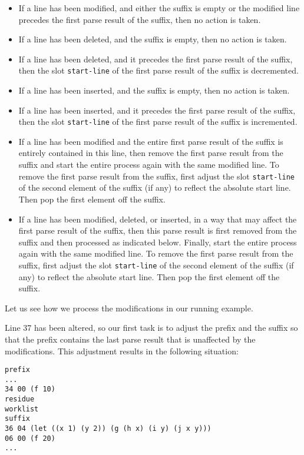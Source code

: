 \begin{itemize}
\item If a line has been modified, and either the suffix is empty or
  the modified line precedes the first parse result of the suffix,
  then no action is taken.
\item If a line has been deleted, and the suffix is empty, then no
  action is taken.
\item If a line has been deleted, and it precedes the first parse
  result of the suffix, then the slot \texttt{start-line} of the first
  parse result of the suffix is decremented.
\item If a line has been inserted, and the suffix is empty, then no
  action is taken.
\item If a line has been inserted, and it precedes the first parse
  result of the suffix, then the slot \texttt{start-line} of the first
  parse result of the suffix is incremented.
\item If a line has been modified and the entire first parse result of
  the suffix is entirely contained in this line, then remove the first
  parse result from the suffix and start the entire process again with
  the same modified line.  To remove the first parse result from the
  suffix, first adjust the slot \texttt{start-line} of the second
  element of the suffix (if any) to reflect the absolute start line.
  Then pop the first element off the suffix.
\item If a line has been modified, deleted, or inserted, in a way that
  may affect the first parse result of the suffix, then this parse
  result is first removed from the suffix and then processed as
  indicated below.  Finally, start the entire process again with the
  same modified line.  To remove the first parse result from the
  suffix, first adjust the slot \texttt{start-line} of the second
  element of the suffix (if any) to reflect the absolute start line.
  Then pop the first element off the suffix.
\end{itemize}

Let us see how we process the modifications in our running example.

Line 37 has been altered, so our first task is to adjust the prefix
and the suffix so that the prefix contains the last parse result that
is unaffected by the modifications.  This adjustment results in the
following situation:

\begin{verbatim}
prefix
...
34 00 (f 10)
residue
worklist
suffix
36 04 (let ((x 1) (y 2)) (g (h x) (i y) (j x y)))
06 00 (f 20)
...
\end{verbatim}

